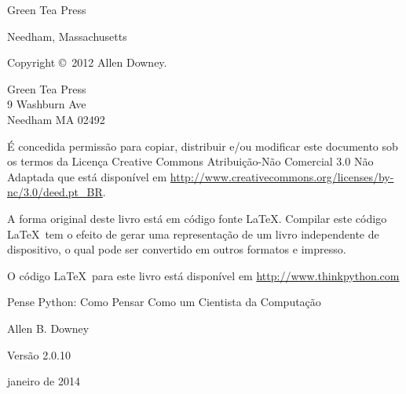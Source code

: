 \documentclass[10pt]{book}
\newcommand{\thetitle}{Pense Python: Como Pensar Como um Cientista da Computação}
\newcommand{\theversion}{2.0.10}
\newcommand{\thedate}{janeiro de 2014}
\begin{document}
\begin{latexonly}
\begin{flushright}
{\Large Green Tea Press}

{\small Needham, Massachusetts}

\vfill

\end{flushright}


\pagebreak
\thispagestyle{empty}

{\small
Copyright \copyright ~2012 Allen Downey.


\vspace{0.2in}

\begin{flushleft}
Green Tea Press       \\
9 Washburn Ave        \\
Needham MA 02492
\end{flushleft}

É concedida permissão para copiar, distribuir e/ou modificar este documento
sob os termos da Licença Creative Commons Atribuição-Não Comercial 3.0 Não Adaptada
que está disponível em \url{http://www.creativecommons.org/licenses/by-nc/3.0/deed.pt_BR}.

A forma original deste livro está em código fonte \LaTeX. Compilar este
código \LaTeX\ tem o efeito de gerar uma representação de um livro
independente de dispositivo, o qual pode ser convertido em outros formatos
e impresso.

O código \LaTeX\ para este livro está disponível em
\url{http://www.thinkpython.com}

\vspace{0.2in}

} %

\end{latexonly}



\begin{htmlonly}


{\Large \thetitle}

{\large Allen B. Downey}

Versão \theversion

\thedate

\setcounter{chapter}{-1}

\end{htmlonly}

\fi
\end{document}
